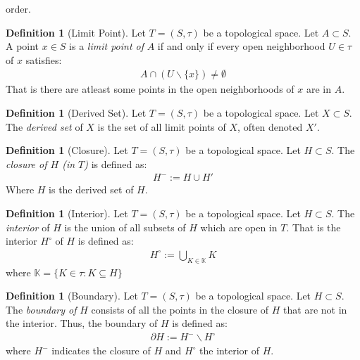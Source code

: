 \documentclass{article}
\theoremstyle{plain}
\theoremstyle{definition}
\newtheorem{definition}[theorem]{Definition}
\newcommand{\del}{\partial}
\begin{document}
order.
\begin{definition}[Limit Point]
	Let $T=(S,\tau)$ be a topological space. Let $A\subset S$. A point $x\in S$
	is a \textit{limit point of} $A$ if and only if every open neighborhood
	$U\in\tau$ of $x$ satisfies:
	\begin{equation}
	\begin{aligned}
		A\cap (U\backslash \{x\})\neq\emptyset
	\end{aligned}
	\end{equation}
	That is there are atleast some points in the open neighborhoods
	of $x$ are in $A$.
\end{definition}
\begin{definition}[Derived Set]
	Let $T=(S,\tau)$ be a topological space. Let $X\subset S$. 
	The \textit{derived set} of $X$ is the set of all limit points of $X$,
	often denoted $X'$.
\end{definition}
\begin{definition}[Closure]
	Let $T=(S,\tau)$ be a topological space. Let $H\subset S$. 
	The \textit{closure of $H$ (in $T$)} is defined as:
	\begin{equation}
	\begin{aligned}
		H^-:=H\cup H'
	\end{aligned}
	\end{equation}
	Where $H$ is the derived set of $H$.
\end{definition}
\begin{definition}[Interior]
	Let $T=(S,\tau)$ be a topological space. Let $H\subset S$. 
	The \textit{interior} of $H$ is the union of all subsets of $H$ which are
	open in $T$. That is the interior $H^\circ$ of $H$ is defined as:
	\begin{equation}
	\begin{aligned}
		H^\circ:=\bigcup_{K\in\mathbb{K}} K
	\end{aligned}
	\end{equation}
	where $\mathbb{K}=\{K\in\tau:K\subseteq H\}$
\end{definition}
\begin{definition}[Boundary]
	Let $T=(S,\tau)$ be a topological space. Let $H\subset S$. 
	The \textit{boundary of} $H$ consists of all the points in the closure of
	$H$ that are not in the interior. Thus, the boundary of $H$ is defined as:
	\begin{equation}
	\begin{aligned}
		\del H := H^-\backslash H^\circ
	\end{aligned}
	\end{equation}
	where $H^-$ indicates the closure of $H$ and $H^\circ$ the interior of $H$.
\end{definition}
\end{document}
